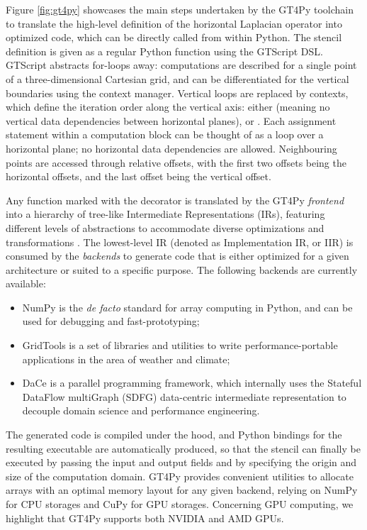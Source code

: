 \documentclass[gmd,manuscript,online]{copernicus}
\theoremstyle{theorem}
\theoremstyle{definition}
\theoremstyle{remark}
\theoremstyle{proposition}
\begin{document}
	Figure \ref{fig:gt4py} showcases the main steps undertaken by the GT4Py toolchain to translate the high-level definition of the horizontal Laplacian operator into optimized code, which can be directly called from within Python. The stencil definition is given as a regular Python function using the GTScript DSL. GTScript abstracts for-loops away: computations are described for a single point of a three-dimensional Cartesian grid, and can be differentiated for the vertical boundaries using the  context manager. Vertical loops are replaced by  contexts, which define the iteration order along the vertical axis: either  (meaning no vertical data dependencies between horizontal planes),  or . Each assignment statement within a computation block can be thought of as a loop over a horizontal plane; no horizontal data dependencies are allowed. Neighbouring points are accessed through relative offsets, with the first two offsets being the horizontal offsets, and the last offset being the vertical offset.

	Any function marked with the  decorator is translated by the GT4Py \emph{frontend} into a hierarchy of tree-like Intermediate Representations (IRs), featuring different levels of abstractions to accommodate diverse optimizations and transformations \citep{gysi21}. The lowest-level IR (denoted as Implementation IR, or IIR) is consumed by the \emph{backends} to generate code that is either optimized for a given architecture or suited to a specific purpose. The following backends are currently available:
	\begin{itemize}
		\item NumPy \citep{harris20} is the \emph{de facto} standard for array computing in Python, and can be used for debugging and fast-prototyping;
		\item GridTools \citep{afanasyev21} is a set of libraries and utilities to write performance-portable applications in the area of weather and climate;
		\item DaCe \citep{ben-nun19} is a parallel programming framework, which internally uses the Stateful DataFlow multiGraph (SDFG) data-centric intermediate representation to decouple domain science and performance engineering.
	\end{itemize}
	The generated code is compiled under the hood, and Python bindings for the resulting executable are automatically produced, so that the stencil can finally be executed by passing the input and output fields and by specifying the origin and size of the computation domain. GT4Py provides convenient utilities to allocate arrays with an optimal memory layout for any given backend, relying on NumPy for CPU storages and CuPy \citep{nishino17} for GPU storages. Concerning GPU computing, we highlight that GT4Py supports both NVIDIA and AMD GPUs.
\end{document}
